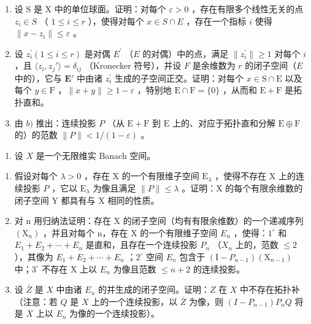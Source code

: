 \begin{enumerate}
\def\labelenumi{\alph{enumi})}
\item
  设 S 是 X 中的单位球面。证明：对每个 \(\varepsilon > 0\) ，存在有限多个线性无关的点 \(z_{i} \in S\) （ \(1 \leqslant i \leqslant r\) ），使得对每个 \(x \in S \cap E\) ，存在一个指标 \(i\) 使得 \(\| x - z_{i} \| \leqslant \varepsilon\) 。
\item
  设 \(z_{i}^{\prime}(1 \leqslant i \leqslant r)\) 是对偶 \(E^{\prime}\) （\(E\) 的对偶）中的点，满足 \(\| z_{i}^{\prime}\| \geqslant 1\) 对每个 \(i\) ，且 \(\langle z_i, z_j' \rangle = \delta_{ij}\) （Kronecker 符号），并设 \(F\) 是余维数为 \(r\) 的闭子空间（\(E\) 中的），它与 \(\mathbf{E}'\) 中由诸 \(z_{i}^{\prime}\) 生成的子空间正交。证明：对每个 \(x\in \mathrm{S}\cap \mathrm{E}\) 以及每个 \(y\in \mathrm{F}\) ，\(\| x + y\| \geqslant 1 - \varepsilon\) ，特别地 \(\mathrm{E}\cap \mathrm{F} = \{0\}\) ，从而和 \(\mathrm{E} + \mathrm{F}\) 是拓扑直和。
\item
  由 \(b)\) 推出：连续投影 \(P\) （从 \(\mathrm{E} + \mathrm{F}\) 到 \(\mathrm{E}\) 上的、对应于拓扑直和分解 \(\mathrm{E} \oplus \mathrm{F}\) 的）的范数 \(\| P \| < 1 / (1 - \varepsilon)\) 。
\end{enumerate}

\begin{enumerate}
\def\labelenumi{\arabic{enumi})}
\setcounter{enumi}{22}
\tightlist
\item
  设 \(X\) 是一个无限维实 Banach 空间。
\end{enumerate}

\begin{enumerate}
\def\labelenumi{\alph{enumi})}
\item
  假设对每个 \(\lambda > 0\) ，存在 X 的一个有限维子空间 \(\mathrm{E}_{\lambda}\) ，使得不存在 X 上的连续投影 \(P\) ，它以 \(\mathrm{E}_{\lambda}\) 为像且满足 \(\| P \| \leqslant \lambda\) 。证明：X 的每个有限余维数的闭子空间 Y 都具有与 X 相同的性质。
\item
  对 n 用归纳法证明：存在 X 的闭子空间（均有有限余维数）的一个递减序列 \((\mathrm{X}_{n})\) ，并且对每个 n，存在 X 的一个有限维子空间 \(E_{n}\) ，使得：\(1^{\circ}\) 和 \(E_{1} + E_{2} + \cdots + E_{n}\) 是直和，且存在一个连续投影 \(P_{n}\) （\(X_{n}\) 上的，范数 \(\leqslant 2\) ），其像为 \(E_{1} + E_{2} + \cdots + E_{n}\) ；\(2^{\circ}\) 空间 \(E_{n}\) 包含于 \((\mathrm{I} - P_{n-1})(\mathrm{X}_{n-1})\) 中；\(3^{\circ}\) 不存在 X 上以 \(E_{n}\) 为像且范数 \(\leqslant n + 2\) 的连续投影。
\item
  设 \(\bar{Z}\) 是 \(X\) 中由诸 \(E_{n}\) 的并生成的闭子空间。证明：\(Z\) 在 \(X\) 中不存在拓扑补（注意：若 \(Q\) 是 \(X\) 上的一个连续投影，以 \(\bar{Z}\) 为像，则 \((I - P_{n-1})P_nQ\) 将是 \(X\) 上以 \(E_{n}\) 为像的一个连续投影）。
\end{enumerate}
